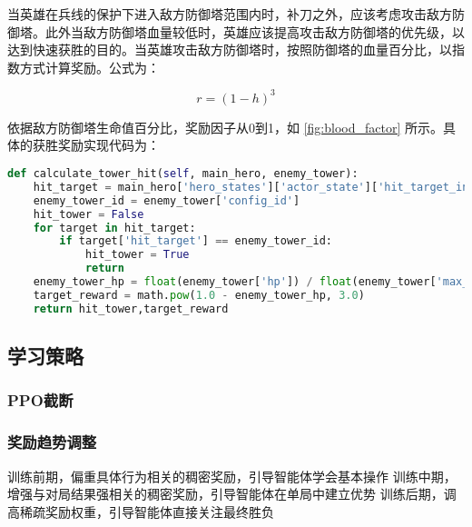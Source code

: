 当英雄在兵线的保护下进入敌方防御塔范围内时，补刀之外，应该考虑攻击敌方防御塔。此外当敌方防御塔血量较低时，英雄应该提高攻击敌方防御塔的优先级，以达到快速获胜的目的。当英雄攻击敌方防御塔时，按照防御塔的血量百分比，以指数方式计算奖励。公式为：

\begin{equation}
    r = (1 - h) ^ {3}
\end{equation}

依据敌方防御塔生命值百分比，奖励因子从0到1，如 \cref{fig:blood_factor} 所示。具体的获胜奖励实现代码为：

\begin{lstlisting}[language=Python]
def calculate_tower_hit(self, main_hero, enemy_tower):
    hit_target = main_hero['hero_states']['actor_state']['hit_target_info']
    enemy_tower_id = enemy_tower['config_id']
    hit_tower = False
    for target in hit_target:
        if target['hit_target'] == enemy_tower_id:
            hit_tower = True
            return
    enemy_tower_hp = float(enemy_tower['hp']) / float(enemy_tower['max_hp'])
    target_reward = math.pow(1.0 - enemy_tower_hp, 3.0)
    return hit_tower,target_reward
\end{lstlisting}

\subsection{学习策略}

\subsubsection{PPO截断}



\subsubsection{奖励趋势调整}
训练前期，偏重具体行为相关的稠密奖励，引导智能体学会基本操作
训练中期，增强与对局结果强相关的稠密奖励，引导智能体在单局中建立优势
训练后期，调高稀疏奖励权重，引导智能体直接关注最终胜负
